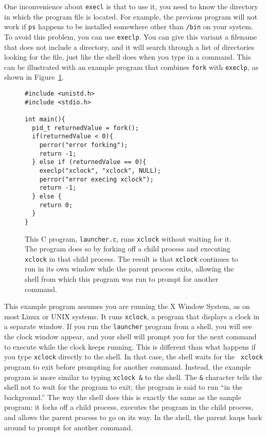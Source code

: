 One inconvenience about \verb|execl| is that to use it, you need to
know the directory in which the program file is located.  For example, the
previous program will not work if \verb|ps| happens to be installed
somewhere other than \verb|/bin| on your system.  To avoid this
problem, you can use \verb|execlp|.
You can give this variant a filename that does not include a
directory, and it will search through a list of directories looking
for the file, just like the shell does when you type in a command.  This
can be illustrated with an example program that combines \verb|fork|
with \verb|execlp|, as shown in Figure~\ref{launcher-code}.
\begin{figure}
\begin{verbatim}
#include <unistd.h>
#include <stdio.h>

int main(){
  pid_t returnedValue = fork();
  if(returnedValue < 0){
    perror("error forking");
    return -1;
  } else if (returnedValue == 0){
    execlp("xclock", "xclock", NULL);
    perror("error execing xclock");
    return -1;
  } else {
    return 0;
  }
}
\end{verbatim}
\caption{This C program, {\tt launcher.c}, runs {\tt xclock}
  without waiting for it.  The program does so by forking off a child process and executing
  {\tt xclock} in that child process.  The result is that {\tt xclock} continues
  to run in its own window while the parent process exits, allowing the shell from
  which this program was run to prompt for another command.}
\label{launcher-code}
\end{figure}

This example program assumes you are running the X Window System,
as on most Linux or UNIX systems. It runs {\tt xclock}, a program that
displays a clock in a separate window.  If you run the \texttt{launcher} program from a
shell, you will see the clock window appear, and your shell will
prompt you for the next command to execute while the clock keeps
running.  This is different than what happens if you type {\tt xclock}
directly to the shell.  In that case, the shell waits for the {\tt
xclock} program to exit before prompting for another command.
Instead, the example program is more similar to typing \verb|xclock &|
to the shell.  The \verb|&| character tells the shell not to wait for
the program to exit; the program is said to run ``in the background.''
The way the shell does this is exactly the same as the sample program:
it forks off a child process, executes the program in the child
process, and allows the parent process to go on its way. In the shell,
the parent loops back
around to prompt for another command.

